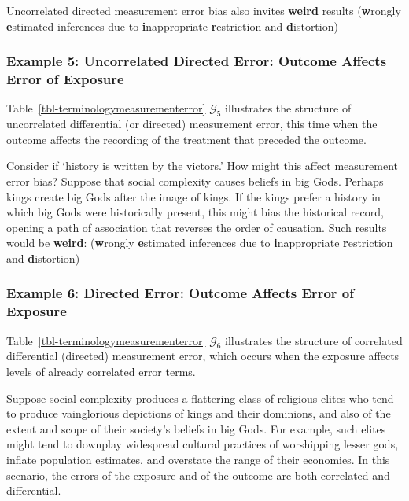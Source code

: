 \documentclass[
  single column]{article}
\begin{document}
Uncorrelated directed measurement error bias also invites \textbf{weird}
results (\textbf{w}rongly \textbf{e}stimated inferences due to
\textbf{i}nappropriate \textbf{r}estriction and \textbf{d}istortion)

\subsubsection{Example 5: Uncorrelated Directed Error: Outcome Affects
Error of
Exposure}\label{example-5-uncorrelated-directed-error-outcome-affects-error-of-exposure}

Table~\ref{tbl-terminologymeasurementerror} \(\mathcal{G}_5\)
illustrates the structure of uncorrelated differential (or directed)
measurement error, this time when the outcome affects the recording of
the treatment that preceded the outcome.

Consider if `history is written by the victors.' How might this affect
measurement error bias? Suppose that social complexity causes beliefs in
big Gods. Perhaps kings create big Gods after the image of kings. If the
kings prefer a history in which big Gods were historically present, this
might bias the historical record, opening a path of association that
reverses the order of causation. Such results would be \textbf{weird}:
(\textbf{w}rongly \textbf{e}stimated inferences due to
\textbf{i}nappropriate \textbf{r}estriction and \textbf{d}istortion)

\subsubsection{Example 6: Directed Error: Outcome Affects Error of
Exposure}\label{example-6-directed-error-outcome-affects-error-of-exposure}

Table~\ref{tbl-terminologymeasurementerror} \(\mathcal{G}_6\)
illustrates the structure of correlated differential (directed)
measurement error, which occurs when the exposure affects levels of
already correlated error terms.

Suppose social complexity produces a flattering class of religious
elites who tend to produce vainglorious depictions of kings and their
dominions, and also of the extent and scope of their society's beliefs
in big Gods. For example, such elites might tend to downplay widespread
cultural practices of worshipping lesser gods, inflate population
estimates, and overstate the range of their economies. In this scenario,
the errors of the exposure and of the outcome are both correlated and
differential.
\end{document}
